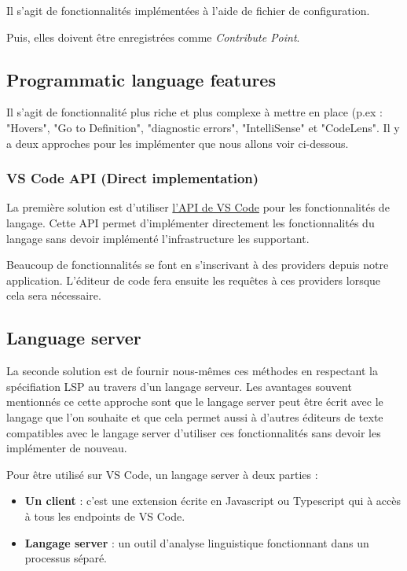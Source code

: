 \documentclass[
    iict, %
    il, %
]{heig-tb}
\begin{document}
Il s'agit de fonctionnalités implémentées à l'aide de fichier de configuration.

Puis, elles doivent être enregistrées comme \emph{Contribute Point}.

\subsection{Programmatic language features}\label{Programmatic language features}
Il s'agit de fonctionnalité plus riche et plus complexe à mettre en place (p.ex : "Hovers", "Go to Definition", "diagnostic errors", "IntelliSense" \space et "CodeLens".
Il y a deux approches pour les implémenter que nous allons voir ci-dessous.

\subsubsection{VS Code API (Direct implementation)}
La première solution est d'utiliser \href{https://code.visualstudio.com/api/references/vscode-api#languages}{l'API de VS Code} pour les fonctionnalités de langage.
Cette API permet d'implémenter directement les fonctionnalités du langage sans devoir implémenté l'infrastructure les supportant.

Beaucoup de fonctionnalités se font en s'inscrivant à des providers depuis notre application.
L'éditeur de code fera ensuite les requêtes à ces providers lorsque cela sera nécessaire.

\subsection{Language server}

La seconde solution est de fournir nous-mêmes ces méthodes en respectant la spécifiation LSP \cite{lsp-specification} au travers d'un langage serveur.
Les avantages souvent mentionnés ce cette approche sont que le langage server peut être écrit avec le langage que l'on souhaite et
que cela permet aussi à d'autres éditeurs de texte compatibles avec le langage server d'utiliser ces fonctionnalités sans devoir les implémenter de nouveau.

Pour être utilisé sur VS Code, un langage server à deux parties :
\begin{itemize}
    \item \textbf{Un client} : c'est une extension écrite en Javascript ou Typescript qui à accès à tous les endpoints de VS Code.
    \item \textbf{Langage server} : un outil d'analyse linguistique fonctionnant dans un processus séparé.
\end{itemize}
\end{document}
